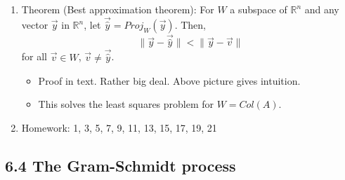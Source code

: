 \documentclass{article}
\begin{document}
\begin{enumerate}
\item Theorem (Best approximation theorem): For $W$ a subspace of $\mathbb{R}^n$ and any vector $\vec{y}$ in $\mathbb{R}^n$, let $\vec{\hat{y}} = Proj_W(\vec{y})$. Then,
\[
\| \vec{y} - \vec{\hat{y}} \| < \| \vec{y} - \vec{v} \|
\]
for all $\vec{v} \in W$, $\vec{v} \neq \vec{\hat{y}}$. 
\begin{itemize}
\item Proof in text. Rather big deal. Above picture gives intuition.
\item This solves the least squares problem for $W = Col(A)$.
\end{itemize}

\item Homework: 1, 3, 5, 7, 9, 11, 13, 15, 17, 19, 21

\end{enumerate}

\subsection{6.4 The Gram-Schmidt process}
\end{document}
